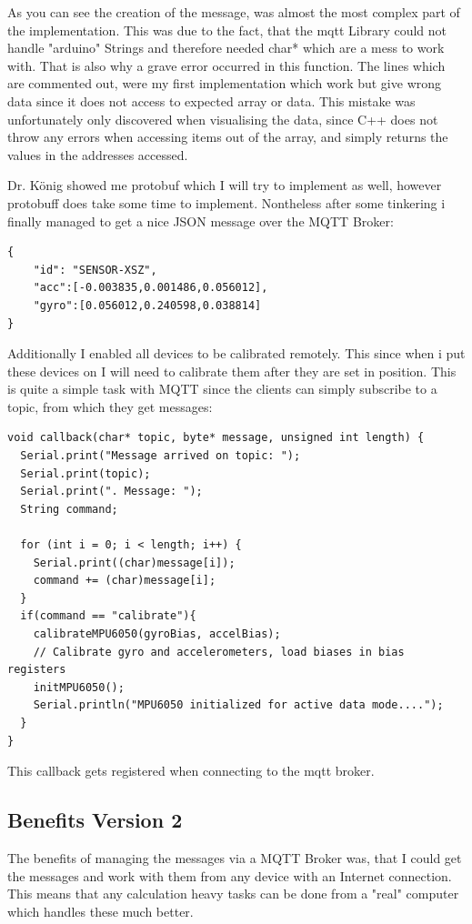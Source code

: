As you can see the creation of the message, was almost the most complex part of the implementation. This was due to the fact, that the mqtt Library could not handle "arduino" Strings and therefore needed char* which are a mess to work with. That is also why a grave error occurred in this function. The lines which are commented out, were my first implementation which work but give wrong data since it does not access to expected array or data.
This mistake was unfortunately only discovered when visualising the data, since C++ does not throw any errors when accessing items out of the array, and simply returns the values in the addresses accessed.

Dr. K\"{o}nig showed me protobuf which I will try to implement as well, however protobuff does take some time to implement. Nontheless after some tinkering i finally managed to get a nice JSON message over the MQTT Broker: 
\begin{lstlisting}
{ 
    "id": "SENSOR-XSZ", 
    "acc":[-0.003835,0.001486,0.056012],
    "gyro":[0.056012,0.240598,0.038814]
}
\end{lstlisting}

Additionally I enabled all devices to be calibrated remotely. This since when i put these devices on I will need to calibrate them after they are set in position. This is quite a simple task with MQTT since the clients can simply subscribe to a topic, from which they get messages: 

\begin{lstlisting}
void callback(char* topic, byte* message, unsigned int length) {
  Serial.print("Message arrived on topic: ");
  Serial.print(topic);
  Serial.print(". Message: ");
  String command;
  
  for (int i = 0; i < length; i++) {
    Serial.print((char)message[i]);
    command += (char)message[i];
  }
  if(command == "calibrate"){
    calibrateMPU6050(gyroBias, accelBias); 
    // Calibrate gyro and accelerometers, load biases in bias registers  
    initMPU6050(); 
    Serial.println("MPU6050 initialized for active data mode....");
  }
}
\end{lstlisting}
This callback gets registered when connecting to the mqtt broker.

\subsection{Benefits Version 2}

The benefits of managing the messages via a MQTT Broker was, that I could get the messages and work with them from any device with an Internet connection. This means that any calculation heavy tasks can be done from a "real" computer which handles these much better. 

